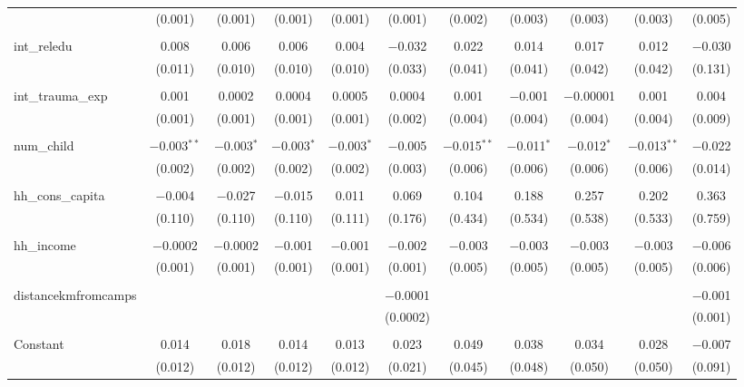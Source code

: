\begin{table}[H]
\begin{tabular}{@{\extracolsep{4pt}}lcccccccccc}
  & (0.001) & (0.001) & (0.001) & (0.001) & (0.001) & (0.002) & (0.003) & (0.003) & (0.003) & (0.005) \\ 
  & & & & & & & & & & \\ 
 int\_reledu & 0.008 & 0.006 & 0.006 & 0.004 & $-$0.032 & 0.022 & 0.014 & 0.017 & 0.012 & $-$0.030 \\ 
  & (0.011) & (0.010) & (0.010) & (0.010) & (0.033) & (0.041) & (0.041) & (0.042) & (0.042) & (0.131) \\ 
  & & & & & & & & & & \\ 
 int\_trauma\_exp & 0.001 & 0.0002 & 0.0004 & 0.0005 & 0.0004 & 0.001 & $-$0.001 & $-$0.00001 & 0.001 & 0.004 \\ 
  & (0.001) & (0.001) & (0.001) & (0.001) & (0.002) & (0.004) & (0.004) & (0.004) & (0.004) & (0.009) \\ 
  & & & & & & & & & & \\ 
 num\_child & $-$0.003$^{**}$ & $-$0.003$^{*}$ & $-$0.003$^{*}$ & $-$0.003$^{*}$ & $-$0.005 & $-$0.015$^{**}$ & $-$0.011$^{*}$ & $-$0.012$^{*}$ & $-$0.013$^{**}$ & $-$0.022 \\ 
  & (0.002) & (0.002) & (0.002) & (0.002) & (0.003) & (0.006) & (0.006) & (0.006) & (0.006) & (0.014) \\ 
  & & & & & & & & & & \\ 
 hh\_cons\_capita & $-$0.004 & $-$0.027 & $-$0.015 & 0.011 & 0.069 & 0.104 & 0.188 & 0.257 & 0.202 & 0.363 \\ 
  & (0.110) & (0.110) & (0.110) & (0.111) & (0.176) & (0.434) & (0.534) & (0.538) & (0.533) & (0.759) \\ 
  & & & & & & & & & & \\ 
 hh\_income & $-$0.0002 & $-$0.0002 & $-$0.001 & $-$0.001 & $-$0.002 & $-$0.003 & $-$0.003 & $-$0.003 & $-$0.003 & $-$0.006 \\ 
  & (0.001) & (0.001) & (0.001) & (0.001) & (0.001) & (0.005) & (0.005) & (0.005) & (0.005) & (0.006) \\ 
  & & & & & & & & & & \\ 
 distancekmfromcamps &  &  &  &  & $-$0.0001 &  &  &  &  & $-$0.001 \\ 
  &  &  &  &  & (0.0002) &  &  &  &  & (0.001) \\ 
  & & & & & & & & & & \\ 
 Constant & 0.014 & 0.018 & 0.014 & 0.013 & 0.023 & 0.049 & 0.038 & 0.034 & 0.028 & $-$0.007 \\ 
  & (0.012) & (0.012) & (0.012) & (0.012) & (0.021) & (0.045) & (0.048) & (0.050) & (0.050) & (0.091) \\ 

\end{tabular}
\end{table}
